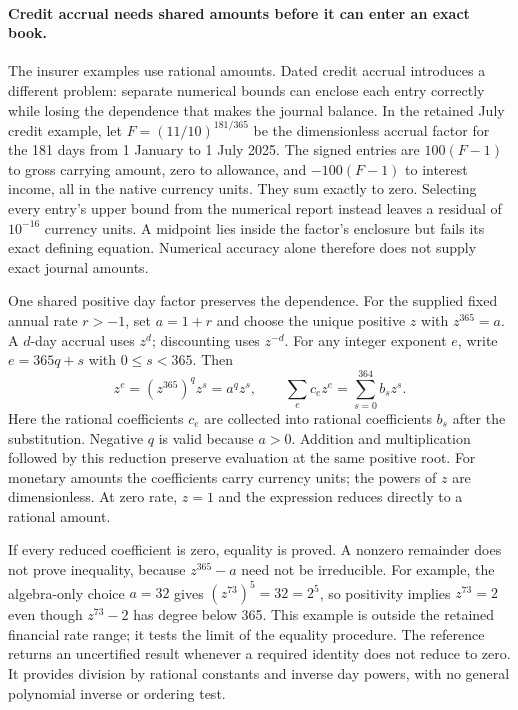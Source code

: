 \paragraph{Credit accrual needs shared amounts before it can enter an exact book.}
The insurer examples use rational amounts. Dated credit accrual introduces a
different problem: separate numerical bounds can enclose each entry correctly
while losing the dependence that makes the journal balance. In the retained
July credit example, let $F=(11/10)^{181/365}$ be the dimensionless accrual
factor for the 181 days from 1 January to 1 July 2025. The signed entries are
$100(F-1)$ to gross carrying amount, zero to allowance, and $-100(F-1)$ to
interest income, all in the native currency units. They sum exactly to zero.
Selecting every entry's upper bound from the numerical report instead leaves
a residual of $10^{-16}$ currency units. A midpoint lies inside the factor's
enclosure but fails its exact defining equation. Numerical accuracy alone
therefore does not supply exact journal amounts.

One shared positive day factor preserves the dependence. For the supplied
fixed annual rate $r>-1$, set $a=1+r$ and choose the unique positive $z$ with
$z^{365}=a$. A $d$-day accrual uses $z^d$; discounting uses $z^{-d}$. For any
integer exponent $e$, write $e=365q+s$ with $0\leq s<365$. Then
\[
 z^e=(z^{365})^qz^s=a^qz^s,
 \qquad
 \sum_e c_ez^e=\sum_{s=0}^{364}b_sz^s .
\]
Here the rational coefficients $c_e$ are collected into rational coefficients
$b_s$ after the substitution. Negative $q$ is valid because $a>0$. Addition
and multiplication followed by this reduction preserve evaluation at the
same positive root. For monetary amounts the coefficients carry currency
units; the powers of $z$ are dimensionless. At zero rate, $z=1$ and the
expression reduces directly to a rational amount.

If every reduced coefficient is zero, equality is proved. A nonzero remainder
does not prove inequality, because $z^{365}-a$ need not be irreducible. For
example, the algebra-only choice $a=32$ gives $(z^{73})^5=32=2^5$, so positivity
implies $z^{73}=2$ even though $z^{73}-2$ has degree below 365. This example is
outside the retained financial rate range; it tests the limit of the equality
procedure. The reference returns an uncertified result whenever a required
identity does not reduce to zero. It provides division by rational constants
and inverse day powers, with no general polynomial inverse or ordering test.

